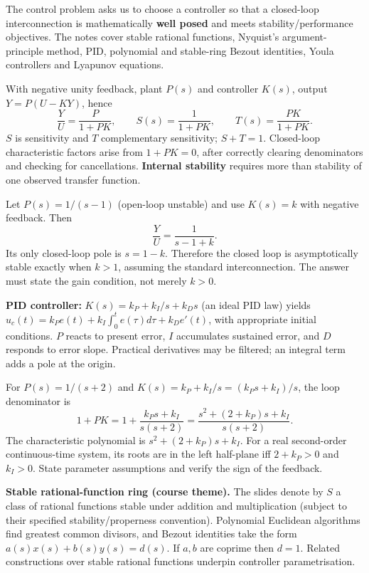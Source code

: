 \documentclass[10pt,a4paper]{article}
\begin{document}
\begin{defbox}The control problem asks us to choose a controller so that a closed-loop interconnection is mathematically \textbf{well posed} and meets stability/performance objectives. The notes cover stable rational functions, Nyquist's argument-principle method, PID, polynomial and stable-ring Bezout identities, Youla controllers and Lyapunov equations.\end{defbox}
\begin{formbox}[title={THE CLOSED-LOOP DENOMINATOR}]
With negative unity feedback, plant $P(s)$ and controller $K(s)$, output $Y=P(U-KY)$, hence
\[\boxed{\frac{Y}{U}=\frac{P}{1+PK}},\qquad S(s)=\frac1{1+PK},\qquad T(s)=\frac{PK}{1+PK}.\]
$S$ is sensitivity and $T$ complementary sensitivity; $S+T=1$. Closed-loop characteristic factors arise from $1+PK=0$, after correctly clearing denominators and checking for cancellations. \textbf{Internal stability} requires more than stability of one observed transfer function.
\end{formbox}
\begin{workbox}[title={WORKED: proportional feedback stabilisation}]
Let $P(s)=1/(s-1)$ (open-loop unstable) and use $K(s)=k$ with negative feedback. Then
\[\frac YU=\frac1{s-1+k}.\]
Its only closed-loop pole is $s=1-k$. Therefore the closed loop is asymptotically stable exactly when $k>1$, assuming the standard interconnection. The answer must state the gain condition, not merely $k>0$.
\end{workbox}
\begin{formbox}\textbf{PID controller:} $K(s)=k_P+k_I/s+k_Ds$ (an ideal PID law) yields $u_c(t)=k_Pe(t)+k_I\int_0^t e(\tau)d\tau+k_De'(t)$, with appropriate initial conditions. $P$ reacts to present error, $I$ accumulates sustained error, and $D$ responds to error slope. Practical derivatives may be filtered; an integral term adds a pole at the origin.\end{formbox}
\begin{workbox}[title={WORKED: PI characteristic equation}]
For $P(s)=1/(s+2)$ and $K(s)=k_P+k_I/s=(k_Ps+k_I)/s$, the loop denominator is
\[1+PK=1+\frac{k_Ps+k_I}{s(s+2)}=\frac{s^2+(2+k_P)s+k_I}{s(s+2)}.\]
The characteristic polynomial is $s^2+(2+k_P)s+k_I$. For a real second-order continuous-time system, its roots are in the left half-plane iff $2+k_P>0$ and $k_I>0$. State parameter assumptions and verify the sign of the feedback.
\end{workbox}
\begin{defbox}\textbf{Stable rational-function ring (course theme).} The slides denote by $S$ a class of rational functions stable under addition and multiplication (subject to their specified stability/properness convention). Polynomial Euclidean algorithms find greatest common divisors, and Bezout identities take the form $a(s)x(s)+b(s)y(s)=d(s)$. If $a,b$ are coprime then $d=1$. Related constructions over stable rational functions underpin controller parametrisation.\end{defbox}
\end{document}
